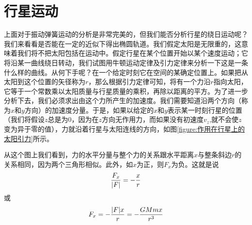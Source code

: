 \section{行星运动}

上面对于振动弹簧运动的分析是非常完美的，但我们能否分析行星的绕日运动呢？我们来看看是否能在一定的近似下得出椭圆轨道。我们假定太阳是无限重的，这意味着我们将不把太阳包括在运动中。假定行星在某个位置开始以某个速度运动；它将沿某一曲线绕日转动，我们试图用牛顿运动定律及引力定律来分析一下这是一条什么样的曲线。从何下手呢？在一个给定时刻它在空间的某确定位置上。如果把从太阳到这个位置的矢径称为$r$，那么根据引力定律可知，将有一个力沿$r$指向太阳，它等于一个常数乘以太阳质量与行星质量的乘积，再除以距离的平方。为了进一步分析下去，我们必须求出由这个力所产生的加速度。我们需要知道沿两个方向（称为$x$和$y$方向）的加速度分量。于是，如果以给定的$x$和$y$表示某一时刻行星的位置（我们将假设$z$总是为0，因为在$z$方向无作用力，而如果没有初速度$v_z$,就不会使$z$变为异于零的值），力就沿着行星与太阳连线的方向，如图\ref{figure:作用在行星上的太阳引力}所示。

从这个图上我们看到，力的水平分量与整个力的关系跟水平距离$x$与整条斜边$r$的关系相同，因为两个三角形相似。此外，如$x$为正，则$F_x$为负。这就是说
\begin{equation*}
    \frac{F_x}{\lvert F\rvert}=-\frac{x}{r}
\end{equation*}
或
\begin{equation*}
    F_x=-\frac{\lvert F\rvert x}{r}=-\frac{GMmx}{r^3}
\end{equation*}

